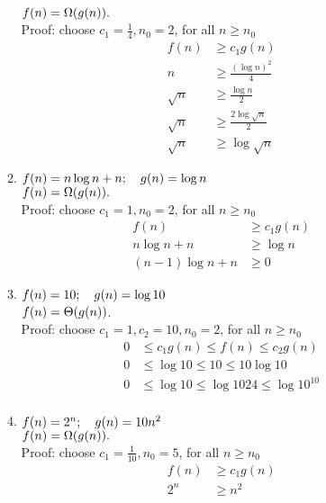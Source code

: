 \documentclass[14pt, a4paper]{article}
\begin{document}
\begin{enumerate}
\begin{enumerate}[label=\alph*.]
        $f(n) = \Omega (g(n)).$\\ 
        
        Proof: choose $c_1 = \frac{1}{4}, n_0 = 2$, for all $n \ge n_0$
        \begin{align*}
            f(n) &\ge c_1 g(n)&\\
            n &\ge \frac{(\log n)^2}{4} & \\
            \sqrt{n} &\ge \frac{\log n}{2}& \\
            \sqrt{n} & \ge \frac{2 \log \sqrt{n}}{2} &\\
            \sqrt{n} & \ge \log \sqrt{n}
        \end{align*}
        
    \item $f(n) = n \log n + n; \hspace{1em} g(n) = \log n$ \\
    
        $f(n) = \Omega (g(n)).$\\ 
        
        Proof: choose $c_1 = 1, n_0 = 2$, for all $n \ge n_0$
        \begin{align*}
            f(n) &\ge c_1 g(n)&\\
            n \log n + n &\ge \log n & \\
            (n-1) \log n + n &\ge 0 &
        \end{align*}
    
    \item $f(n) = 10; \hspace{1em} g(n) = \log 10$ \\
    
        $f(n) = \Theta (g(n))$.\\ 
        
        Proof: choose $c_1 = 1, c_2 = 10, n_0 = 2$, for all $n \ge n_0$
        \begin{align*}
            0 &\le c_1 g(n) \le f(n) \le c_2 g(n) &\\
            0 &\le \log 10 \le 10 \le 10 \log 10 & \\
            0 &\le \log 10 \le \log 1024 \le \log 10^{10} & \\
        \end{align*}
    
    \item $f(n) = 2^n; \hspace{1em} g(n) = 10 n^2$ \\
    
        $f(n) = \Omega (g(n)).$\\ 
        
        Proof: choose $c_1 = \frac{1}{10}, n_0 = 5$, for all $n \ge n_0$
         \begin{align*}
            f(n) &\ge c_1 g(n) & \\
            2^n &\ge n^2 &
        \end{align*}
    

\end{enumerate}
\end{enumerate}
\end{document}
